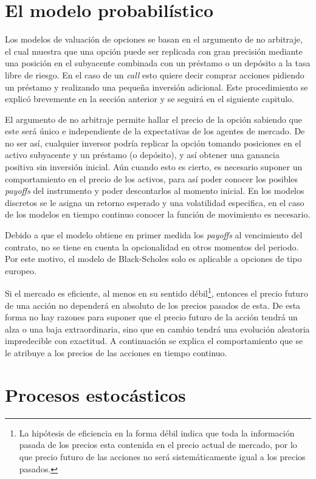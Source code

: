 \section{El modelo probabilístico}

Los modelos de valuación de opciones se basan en el argumento de no arbitraje, el cual muestra que una opción puede ser replicada con gran precisión mediante una posición en el subyacente combinada con un préstamo o un depósito a la tasa libre de riesgo. En el caso de un \textit{call} esto quiere decir comprar acciones pidiendo un préstamo y realizando una pequeña inversión adicional. Este procedimiento se explicó brevemente en la sección anterior y se seguirá en el siguiente capitulo.

El argumento de no arbitraje permite hallar el precio de la opción sabiendo que este será único e independiente de la expectativas de los agentes de mercado. De no ser así, cualquier inversor podría replicar la opción tomando posiciones en el activo subyacente y un préstamo (o depósito), y así obtener una ganancia positiva sin inversión inicial.  Aún cuando esto es cierto, es necesario suponer un comportamiento en el precio de los activos, para así poder conocer los posibles \textit{payoffs} del instrumento y poder descontarlos al momento inicial. En los modelos discretos se le asigna un retorno esperado y una volatilidad especifica, en el caso de los modelos en tiempo continuo conocer la función de movimiento es necesario.

Debido a que el modelo obtiene en primer medida los \textit{payoffs} al vencimiento del contrato, no se tiene en cuenta la opcionalidad en otros momentos del periodo. Por este motivo, el modelo de Black-Scholes solo es aplicable a opciones de tipo europeo.

Si el mercado es eficiente, al menos en su sentido débil\footnote{La hipótesis de eficiencia en la forma débil indica que toda la información pasada de los precios esta contenida en el precio actual de mercado, por lo que precio futuro de las acciones no será sistemáticamente igual a los precios pasados.}, entonces el precio futuro de una acción no dependerá en absoluto de los precios pasados de esta. De esta forma no hay razones para suponer que el precio futuro de la acción tendrá un alza o una baja extraordinaria, sino que en cambio tendrá una evolución aleatoria impredecible con exactitud. A continuación se explica el comportamiento que se le atribuye a los precios de las acciones en tiempo continuo.

\section{Procesos estocásticos}

